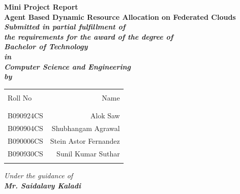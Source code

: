 \pagestyle{headings}%
\thispagestyle{empty}%
\begin{center}%
	\Large\bf{Mini Project Report}\\%
	\vspace{0.5cm}%
	\huge\bf{Agent Based Dynamic Resource Allocation on Federated Clouds}\\%
               \vspace{1cm}%
	\small\it{Submitted in partial fulfillment of}\\%
	\small\it{the requirements for the award of the degree of}\\%
	\vspace{0.5cm}%
	\large\bf\it{Bachelor of Technology}\\%
	\small\it{in}\\%
	\large\it{Computer Science and Engineering}\\%
	\vspace{0.5cm}%
	\Large\it {by}\\%
	\vspace{0.3cm}%
	\begin{table}[h]
		\centering
		\begin{tabular}{lr}\hline \\
			Roll No & Name \\ \\ \hline
			\\
            B090924CS & Alok Saw \\ 
            B090904CS & Shubhangam Agrawal \\ 
            B090006CS & Stein Astor Fernandez \\ 
            B090930CS & Sunil Kumar Suthar \\ \\ \hline 
		\end{tabular}
	\end{table}
	\Large\it {Under the guidance of}\\%
	\normalfont\bf{Mr. Saidalavy Kaladi}\\%
	\begin{figure}[!ht]
		\begin{center}

\end{center}
\end{figure}
\end{center}
